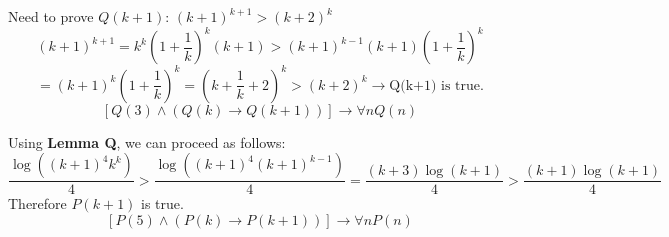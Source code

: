 \documentclass[12pt]{article}
\newenvironment{lemma}[2][Lemma]{\begin{trivlist}
\item[\hskip \labelsep {\bfseries #1}\hskip \labelsep {\bfseries #2.}]}{\end{trivlist}}
\newenvironment{problem}[2][Problem]{\begin{trivlist}
\item[\hskip \labelsep {\bfseries #1}\hskip \labelsep {\bfseries #2.}]}{\end{trivlist}}
\begin{document}
\begin{problem}{6}
\begin{enumerate}
\begin{lemma}{Q}
            Need to prove $Q(k+1)$: $(k+1)^{k+1} > (k+2)^k$
            $$(k+1)^{k+1} = k^k\left(1+\frac{1}{k}\right)^k(k+1) > (k+1)^{k-1}(k+1)\left(1+\frac{1}{k}\right)^k$$
            $$ = (k+1)^{k}\left(1+\frac{1}{k}\right)^k = \left(k+\frac{1}{k} + 2\right)^k > (k+2)^k \rightarrow \text{Q(k+1) is true.}$$
            $$[Q(3) \land (Q(k) \rightarrow Q(k+1))] \rightarrow \forall n Q(n)$$ 
        \end{lemma}
        Using \textbf{Lemma Q}, we can proceed as follows:\\
        $$\frac{\log((k+1)^4k^k)}{4} > \frac{\log((k+1)^4(k+1)^{k-1})}{4} = \frac{(k+3)\log(k+1)}{4} > \frac{(k+1)\log(k+1)}{4}$$
        Therefore $P(k+1)$ is true.\\
        $$[P(5) \land (P(k) \rightarrow P(k+1))] \rightarrow \forall n P(n)$$
    \end{enumerate}
\end{problem}

 
\end{document}
